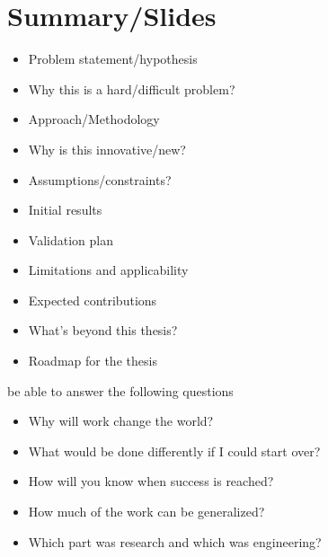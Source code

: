 \section{Summary/Slides}
\begin{itemize}
    \item Problem statement/hypothesis
    \item Why this is a hard/difficult problem?
    \item Approach/Methodology
    \item Why is this innovative/new?
    \item Assumptions/constraints?
    \item Initial results
    \item  Validation plan
    \item Limitations and applicability
    \item Expected contributions
    \item What's beyond  this thesis?
    \item Roadmap for the thesis
\end{itemize}

be able to answer the following questions
\begin{itemize}
    \item Why will work change the world?
    \item What would be done differently if I could start over?
    \item How will you know when success is reached?
    \item How much of the work can be generalized?
    \item Which part was research and which was engineering?
\end{itemize}
